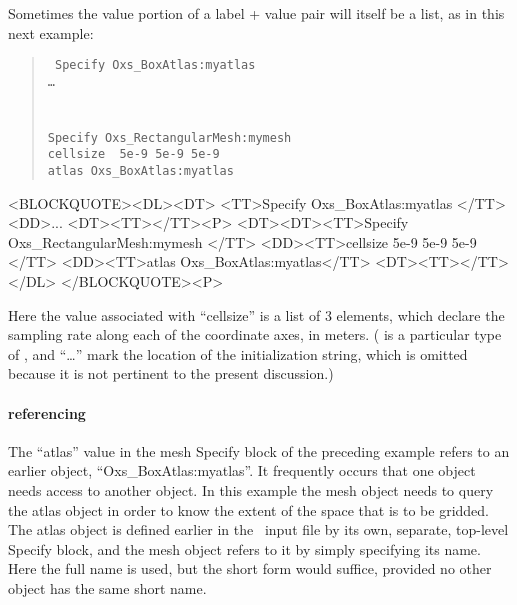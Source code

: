 Sometimes the value portion of a label + value pair will itself be a list,
as in this next example:
\begin{latexonly}
\begin{quote}\tt
Specify Oxs\_BoxAtlas:myatlas \ocb\\
\bi\bi\ldots\\
\ccb\\
\\
Specify Oxs\_RectangularMesh:mymesh \ocb \\
\bi cellsize \ocb\ 5e-9 5e-9 5e-9 \ccb\\
\bi atlas Oxs\_BoxAtlas:myatlas\\
\ccb
\end{quote}
\end{latexonly}
\begin{rawhtml}<BLOCKQUOTE><DL><DT>
<TT>Specify Oxs_BoxAtlas:myatlas {</TT>
<DD>...
<DT><TT>}</TT><P>
<DT><DT><TT>Specify Oxs_RectangularMesh:mymesh {</TT>
<DD><TT>cellsize { 5e-9 5e-9 5e-9 }</TT>
<DD><TT>atlas Oxs_BoxAtlas:myatlas</TT>
<DT><TT>}</TT></DL>
</BLOCKQUOTE><P>
\end{rawhtml}
Here the value associated with ``cellsize'' is a list of 3 elements,
which declare the sampling rate along each of the coordinate axes, in
meters.  ( is a particular type of ,
and ``\ldots'' mark the location of the 
initialization string, which is omitted because it is not pertinent to
the present discussion.)


\paragraph{ referencing}%
\label{par:oxsExtReferencing}
The ``atlas'' value in the mesh Specify block of the preceding example
refers to an earlier  object, ``Oxs\_BoxAtlas:myatlas''.
It frequently occurs that one  object needs access to
another  object.  In this example the mesh object
 needs to query the atlas object  in order to
know the extent of the space that is to be gridded.  The atlas object is
defined earlier in the \MIF\ input file by its own, separate, top-level
Specify block, and the mesh object refers to it by simply specifying its
name.  Here the full name is used, but the short form 
would suffice, provided no other  object has the same short
name.

